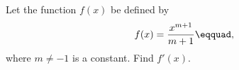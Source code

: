 Let the function $f(x)$ be defined by 
\begin{equation*}
  f(x) = \frac{x^{m+1}}{m+1}\eqquad,
\end{equation*}
where $m\ne -1$ is a constant. Find $f'(x)$.\answercheck
